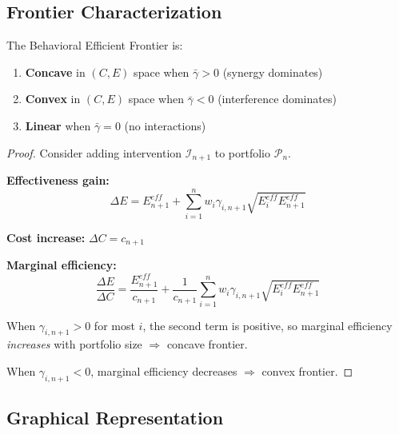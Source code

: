 \subsection{Frontier Characterization}

\begin{theorem}
\label{thm:frontier-shape}
The Behavioral Efficient Frontier is:
\begin{enumerate}
\item \textbf{Concave} in $(C, E)$ space when $\bar{\gamma} > 0$ (synergy dominates)
\item \textbf{Convex} in $(C, E)$ space when $\bar{\gamma} < 0$ (interference dominates)
\item \textbf{Linear} when $\bar{\gamma} = 0$ (no interactions)
\end{enumerate}
\end{theorem}

\begin{proof}
Consider adding intervention $\mathcal{I}_{n+1}$ to portfolio $\mathcal{P}_n$.

\textbf{Effectiveness gain:}
\begin{equation}
\Delta E = E_{n+1}^{eff} + \sum_{i=1}^{n} w_i \gamma_{i,n+1} \sqrt{E_i^{eff} E_{n+1}^{eff}}
\end{equation}

\textbf{Cost increase:} $\Delta C = c_{n+1}$

\textbf{Marginal efficiency:}
\begin{equation}
\frac{\Delta E}{\Delta C} = \frac{E_{n+1}^{eff}}{c_{n+1}} + \frac{1}{c_{n+1}} \sum_{i=1}^{n} w_i \gamma_{i,n+1} \sqrt{E_i^{eff} E_{n+1}^{eff}}
\end{equation}

When $\gamma_{i,n+1} > 0$ for most $i$, the second term is positive, so marginal
efficiency \textit{increases} with portfolio size $\Rightarrow$ concave frontier.

When $\gamma_{i,n+1} < 0$, marginal efficiency decreases $\Rightarrow$ convex frontier.
\end{proof}

\subsection{Graphical Representation}

